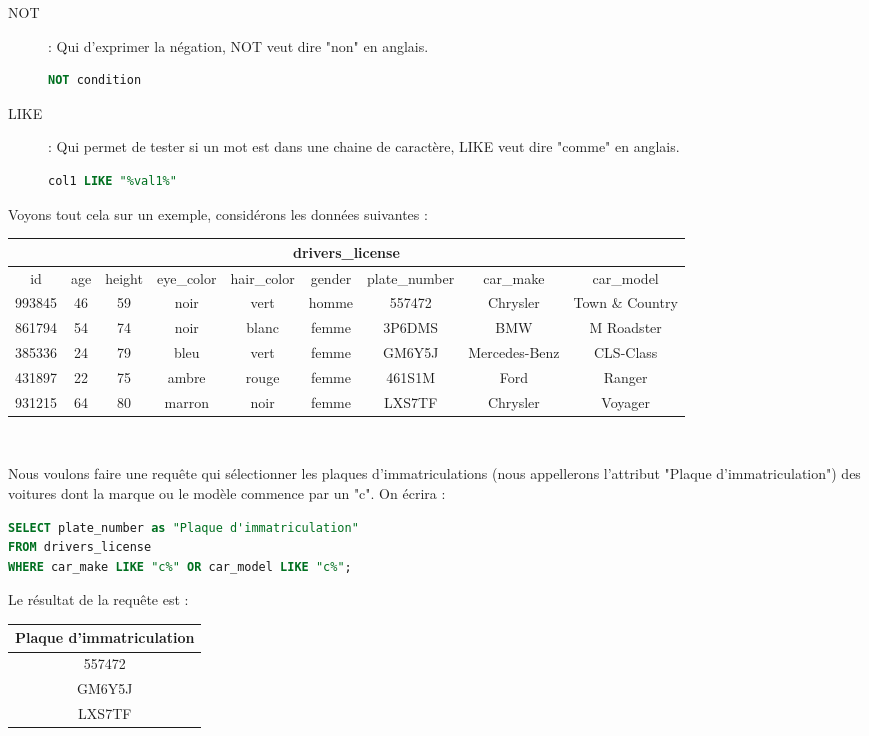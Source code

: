 \begin{description}
    \item [NOT]: Qui d'exprimer la négation, NOT veut dire "non" en anglais.
    \begin{lstlisting}[style=SQLstyle, language=SQL]
    NOT condition
    \end{lstlisting}
    
    \item [LIKE]: Qui permet de tester si un mot est dans une chaine de caractère, LIKE veut dire "comme" en anglais.
    \begin{lstlisting}[style=SQLstyle, language=SQL]
    col1 LIKE "%val1%"
    \end{lstlisting}
\end{description}

Voyons tout cela sur un exemple, considérons les données suivantes :

\begin{center}
\begin{tabular}{|c c c c c c c c c|}
\hline
\multicolumn{9}{|c|}{\textbf{drivers\_license}} \\
\hline
    id & age & height & eye\_color & hair\_color & gender & plate\_number & car\_make & car\_model \\
    \hline
    \hline
    993845	&46	&59	&noir	&vert	&homme	&557472	&Chrysler	&Town \& Country\\
    861794	&54	&74	&noir	&blanc	&femme	&3P6DMS	&BMW	&M Roadster\\
385336	&24	&79	&bleu	&vert	&femme	&GM6Y5J	&Mercedes-Benz	&CLS-Class   \\
431897	&22	&75	&ambre	&rouge	&femme	&461S1M	&Ford	&Ranger\\
931215	&64	&80	&marron	&noir	&femme	&LXS7TF	&Chrysler	&Voyager\\
\hline

\hline
\end{tabular}\\    
\end{center}
Nous voulons faire une requête qui sélectionner les plaques d'immatriculations (nous appellerons l'attribut "Plaque d'immatriculation") des voitures dont la marque ou le modèle commence par un "c".
On écrira :
\begin{lstlisting}[style=SQLstyle, language=SQL]
SELECT plate_number as "Plaque d'immatriculation"
FROM drivers_license
WHERE car_make LIKE "c%" OR car_model LIKE "c%";
\end{lstlisting}

Le résultat de la requête est :
\begin{center}
\begin{tabular}{| c |}
    \hline
    Plaque d'immatriculation \\
    \hline
    \hline
    557472\\
    GM6Y5J\\
    LXS7TF\\
    \hline
\end{tabular}\\    
\end{center}

